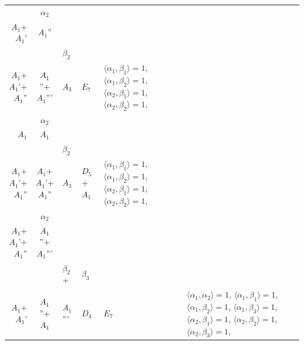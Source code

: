 \documentclass[12pt]{report}
\begin{document}
\begin{appendix}
{\begin{longtable}{rcl p{1cm}p{1cm}p{3cm} }
\begin{tabular}{cc}$\alpha_1$+ & $\alpha_2$\\\tiny{ $A_1$+$A_1$' } & \tiny{ $A_1$'' }\end{tabular} &\begin{tabular}{c} = \\~ \end{tabular} & \begin{tabular}{cc}$\beta_1$+ & $\beta_2$\\\tiny{ $A_1$+$A_1$'+$A_1$'' } & \tiny{ $A_1$''+$A_1$''' }\end{tabular} & $A_3$ & $E_7$ &  $\langle\alpha_1, \beta_1\rangle=1$, $\langle\alpha_1, \beta_2\rangle=1$, $\langle\alpha_2, \beta_1\rangle=1$, $\langle\alpha_2, \beta_2\rangle=1$, 
\\
\begin{tabular}{cc}$\alpha_1$+ & $\alpha_2$\\\tiny{ $A_1$ } & \tiny{ $A_1$ }\end{tabular} &\begin{tabular}{c} = \\~ \end{tabular} & \begin{tabular}{cc}$\beta_1$+ & $\beta_2$\\\tiny{ $A_1$+$A_1$'+$A_1$'' } & \tiny{ $A_1$+$A_1$'+$A_1$'' }\end{tabular} & $A_3$ & $D_5$+$A_1$ &  $\langle\alpha_1, \beta_1\rangle=1$, $\langle\alpha_1, \beta_2\rangle=1$, $\langle\alpha_2, \beta_1\rangle=1$, $\langle\alpha_2, \beta_2\rangle=1$, 
\\
\begin{tabular}{cc}$\alpha_1$+ & $\alpha_2$\\\tiny{ $A_1$+$A_1$'+$A_1$'' } & \tiny{ $A_1$''+$A_1$''' }\end{tabular} &\begin{tabular}{c} = \\~ \end{tabular} & \begin{tabular}{ccc}$\beta_1$+ & $\beta_2$+ & $\beta_3$\\\tiny{ $A_1$+$A_1$' } & \tiny{ $A_1$''+$A_1$ } & \tiny{ $A_1$''' }\end{tabular} & $D_4$ & $E_7$ & $\langle\alpha_1, \alpha_2\rangle=1$,  $\langle\alpha_1, \beta_1\rangle=1$, $\langle\alpha_1, \beta_2\rangle=1$, $\langle\alpha_1, \beta_3\rangle=1$, $\langle\alpha_2, \beta_1\rangle=1$, $\langle\alpha_2, \beta_2\rangle=1$, $\langle\alpha_2, \beta_3\rangle=1$, 
\\

\end{longtable}}
\end{appendix}
\end{document}
